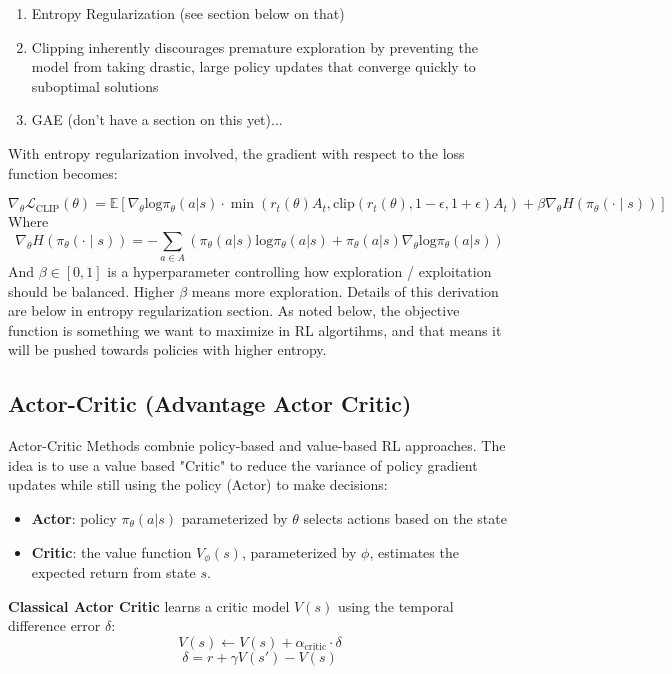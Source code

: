 \documentclass[12pt]{article}
\begin{document}
\begin{enumerate}
\item Entropy Regularization (see section below on that)
\item Clipping inherently discourages premature exploration by preventing the model from taking drastic, large policy updates that converge quickly to suboptimal solutions
\item GAE (don't have a section on this yet)...
\end{enumerate}

With entropy regularization involved, the gradient with respect to the loss function becomes:

\[
\nabla_\theta \mathcal{L}_{\text{CLIP}}(\theta) =  \mathbb{E} \left[ \nabla_\theta \text{log}\pi_\theta(a|s) \cdot \min (r_t(\theta)A_t, \text{clip}(r_t(\theta), 1 - \epsilon, 1+\epsilon)A_t) + \beta \nabla_\theta H(\pi_\theta(\cdot \mid s))\right]
\]
Where
\[\nabla_\theta H(\pi_\theta(\cdot \mid s))  =  -\sum_{a \in A} (\pi_\theta(a|s)\text{log}\pi_\theta(a|s) + \pi_\theta(a|s)\nabla_\theta \text{log} \pi_\theta (a|s))\]
And \(\beta \in [0,1]\) is a hyperparameter controlling how exploration / exploitation should be balanced. Higher \(\beta\) means more exploration. Details of this derivation are below in entropy regularization section. As noted below, the objective function is something we want to maximize in RL algortihms, and that means it will be pushed towards policies with higher entropy.

\subsection{Actor-Critic (Advantage Actor Critic)}
Actor-Critic Methods combnie policy-based and value-based RL approaches. The idea is to use a value based "Critic" to reduce the variance of policy gradient updates while still using the policy (Actor) to make decisions:
\begin{itemize}
\item \textbf{Actor}: policy \(\pi_\theta(a|s)\) parameterized by \(\theta\) selects actions based on the state
\item \textbf{Critic}: the value function \(V_\phi(s)\), parameterized by \(\phi\), estimates the expected return from state \(s\).
\end{itemize}
\textbf{Classical Actor Critic} learns a critic model \(V(s)\) using the temporal difference error \(\delta\):
\[V(s) \leftarrow V(s) + \alpha_\text{critic}\cdot \delta\]
\[\delta = r + \gamma V(s') - V(s)\]
\end{document}
